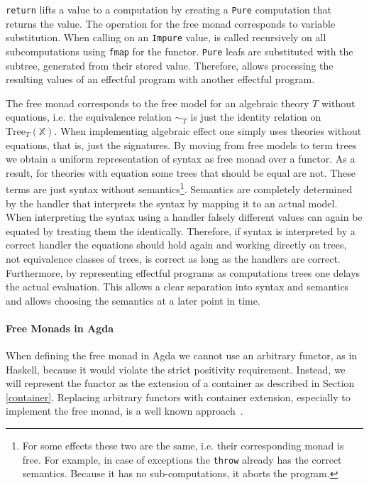 \texttt{return} lifts a value to a computation by creating a
\texttt{Pure} computation that returns the value.
The \bind{} operation for the free monad corresponds to variable substitution.
When calling \bind{} on an \texttt{Impure} value, \bind{} is called
recursively on all subcomputations using \texttt{fmap} for the
functor.
\texttt{Pure} leafs are substituted with the subtree, generated
from their stored value.
Therefore, \bind{} allows processing the resulting values of an effectful
program with another effectful program.

The free monad corresponds to the free model for an algebraic theory $T$ without
equations, i.e. the equivalence relation $\sim_T$ is just the identity relation on
$\mathrm{Tree}_T(\mathbb{X})$.
When implementing algebraic effect one simply uses theories without equations,
that is, just the signatures.
By moving from free models to term trees we obtain a uniform representation of
syntax as free monad over a functor.
As a result, for theories with equation some trees that should be equal are
not.
These terms are just syntax without semantics\footnote{For some effects these
  two are the same, i.e. their corresponding monad is free.
  For example, in case of exceptions the \texttt{throw} already has the correct
  semantics.
  Because it has no sub-computations, it aborts the program.}.
Semantics are completely determined by the handler that interprets the syntax
by mapping it to an actual model.
When interpreting the syntax using a handler falsely different values can again
be equated by treating them the identically.
Therefore, if syntax is interpreted by a correct handler the equations should
hold again and working directly on trees, not equivalence classes of trees, is
correct as long as the handlers are correct.
Furthermore, by representing effectful programs as computations trees one delays
the actual evaluation.
This allows a clear separation into syntax and semantics and allows choosing the
semantics at a later point in time.

\paragraph{Free Monads in Agda}
When defining the free monad in Agda we cannot use an arbitrary functor, as in
Haskell, because it would violate the strict positivity requirement.
Instead, we will represent the functor as the extension of a container as
described in Section \ref{container}.
Replacing arbitrary functors with container extension, especially to implement
the free monad, is a well known
approach~\cite{DBLP:journals/programming/DylusCT19,DBLP:conf/haskell/ChristiansenDB19,DBLP:conf/mpc/McBride15}.

